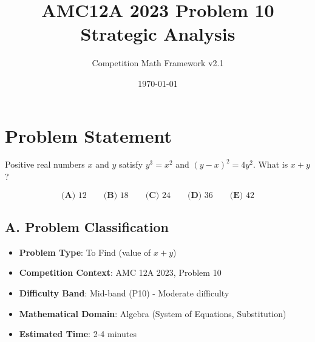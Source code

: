 \documentclass[12pt]{article}
\begin{document}
\title{AMC12A 2023 Problem 10\\Strategic Analysis}
\author{Competition Math Framework v2.1}
\date{\today}
\maketitle

\section*{Problem Statement}

Positive real numbers $x$ and $y$ satisfy $y^3=x^2$ and $(y-x)^2=4y^2$. What is $x+y$?

$$\textbf{(A) }12\qquad\textbf{(B) }18\qquad\textbf{(C) }24\qquad\textbf{(D) }36\qquad\textbf{(E) }42$$

\begin{problemconfigbox}
\subsection*{A. Problem Classification}
\begin{itemize}[leftmargin=*]
    \item \textbf{Problem Type}: To Find (value of $x+y$)
    \item \textbf{Competition Context}: AMC 12A 2023, Problem 10
    \item \textbf{Difficulty Band}: Mid-band (P10) - Moderate difficulty
    \item \textbf{Mathematical Domain}: Algebra (System of Equations, Substitution)
    \item \textbf{Estimated Time}: 2-4 minutes
\end{itemize}


\end{problemconfigbox}
\end{document}
